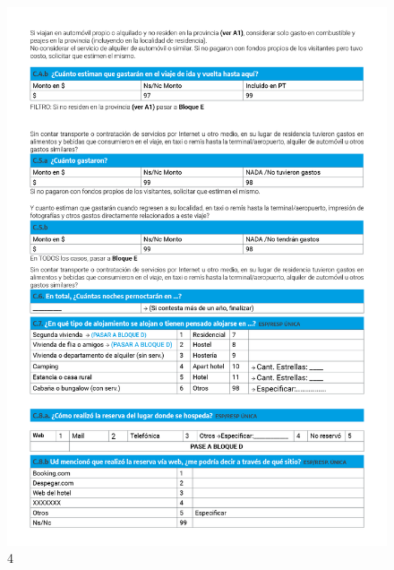 \documentclass[
]{book}
\begin{document}
\begin{figure}

{\centering \includegraphics[width=1\linewidth]{imagenes/graf04} 

}

\caption{4}\label{fig:004}
\end{figure}
\end{document}
